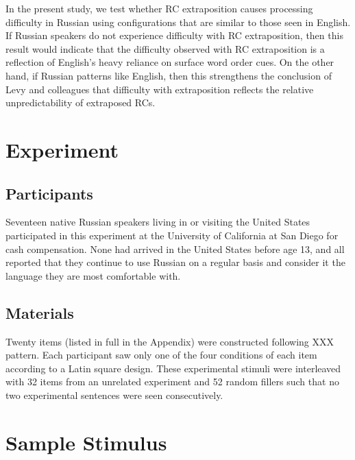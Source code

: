 \documentclass[12pt]{article}
\begin{document}
	 In the present study, we test whether RC extraposition causes processing difficulty in Russian using configurations that are similar to those seen in English. If Russian speakers do not experience difficulty with RC extraposition, then this result would indicate that the difficulty observed with RC extraposition is a reflection of English's heavy reliance on surface word order cues. On the other hand, if Russian patterns like English, then this strengthens the conclusion of Levy and colleagues that difficulty with extraposition reflects the relative unpredictability of extraposed RCs. 
	  




\section{Experiment}
\label{sec:experiment}

\subsection{Participants}
\label{sec:participants}

Seventeen native Russian speakers living in or visiting the United
States participated in this experiment at the University of California
at San Diego for cash compensation.  None had arrived in the United
States before age 13, and all reported that they continue to use
Russian on a regular basis and consider it the language they are most
comfortable with.

\subsection{Materials}
\label{sec:materials}


Twenty items (listed in full in the Appendix) were constructed following XXX
pattern.  Each participant saw only one of the four conditions of each
item according to a Latin square design.  These experimental stimuli
were interleaved with 32 items from an unrelated experiment and 52
random fillers such that no two experimental sentences were seen
consecutively.

\section{Sample Stimulus}
\label{sec:sample-stimulus}
\end{document}
